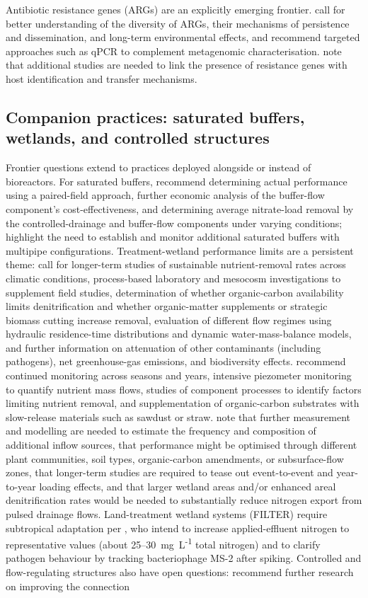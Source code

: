 Antibiotic resistance genes (ARGs) are an explicitly emerging frontier. \textcite{Smith2019b} call for better understanding of the diversity of ARGs, their mechanisms of persistence and dissemination, and long-term environmental effects, and recommend targeted approaches such as qPCR to complement metagenomic characterisation. \textcite{Rieke2018} note that additional studies are needed to link the presence of resistance genes with host identification and transfer mechanisms.

\subsection{Companion practices: saturated buffers, wetlands, and controlled structures}
Frontier questions extend to practices deployed alongside or instead of bioreactors. For saturated buffers, \textcite{Ghane2025} recommend determining actual performance using a paired-field approach, further economic analysis of the buffer-flow component's cost-effectiveness, and determining average nitrate-load removal by the controlled-drainage and buffer-flow components under varying conditions; \textcite{Jaynes2019b} highlight the need to establish and monitor additional saturated buffers with multipipe configurations. Treatment-wetland performance limits are a persistent theme: \textcite{Tanner2005} call for longer-term studies of sustainable nutrient-removal rates across climatic conditions, process-based laboratory and mesocosm investigations to supplement field studies, determination of whether organic-carbon availability limits denitrification and whether organic-matter supplements or strategic biomass cutting increase removal, evaluation of different flow regimes using hydraulic residence-time distributions and dynamic water-mass-balance models, and further information on attenuation of other contaminants (including pathogens), net greenhouse-gas emissions, and biodiversity effects. \textcite{Tanner2003} recommend continued monitoring across seasons and years, intensive piezometer monitoring to quantify nutrient mass flows, studies of component processes to identify factors limiting nutrient removal, and supplementation of organic-carbon substrates with slow-release materials such as sawdust or straw. \textcite{Tanner2005b} note that further measurement and modelling are needed to estimate the frequency and composition of additional inflow sources, that performance might be optimised through different plant communities, soil types, organic-carbon amendments, or subsurface-flow zones, that longer-term studies are required to tease out event-to-event and year-to-year loading effects, and that larger wetland areas and/or enhanced areal denitrification rates would be needed to substantially reduce nitrogen export from pulsed drainage flows. Land-treatment wetland systems (FILTER) require subtropical adaptation per \textcite{Gardner2001}, who intend to increase applied-effluent nitrogen to representative values (about 25--30~mg~L\textsuperscript{-1} total nitrogen) and to clarify pathogen behaviour by tracking bacteriophage MS-2 after spiking. Controlled and flow-regulating structures also have open questions: \textcite{Popek2021} recommend further research on improving the connection 